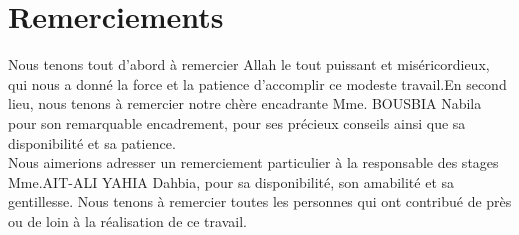 \chapter*{Remerciements}


 Nous tenons tout d’abord à remercier Allah le tout puissant et miséricordieux, qui nous a donné la force et la patience d’accomplir ce modeste travail.En second lieu, nous tenons à remercier notre chère encadrante Mme. BOUSBIA Nabila pour son remarquable encadrement, pour ses précieux conseils ainsi que sa disponibilité et sa patience.
 \\
 \vspace{5px}
 Nous aimerions adresser un remerciement particulier à la responsable des stages Mme.AIT-ALI YAHIA Dahbia, pour sa disponibilité, son amabilité et sa gentillesse.
 \vspace{5px}
 \newline
 Nous tenons à remercier toutes les personnes qui ont contribué de près ou de loin à la réalisation de ce travail.